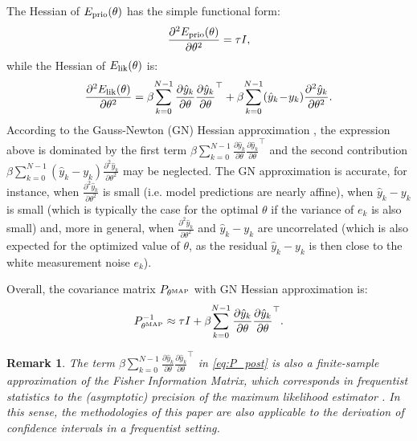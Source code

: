 \documentclass{article}
\newcommand{\nsamp}{N}
\newcommand{\MAP}{{\rm MAP}}
\newcommand{\mean}[1]{\hat{#1}}
\newtheorem{remark}{Remark}%
\begin{document}
The Hessian of $E_{\rm prio}(\theta)$ has the simple functional form:
\begin{equation}
 \frac{\partial^2 E_{\rm prio}(\theta)}{\partial \theta^2} 
 = \tau I,
\end{equation}
while the Hessian of $E_{\rm lik}(\theta)$ is:
\begin{equation}
\label{eq:full_hessian}
\frac{\partial^2 E_{\rm lik}(\theta)}{\partial \theta^2}
=  \beta \!\sum_{k=0}^{\nsamp-1} \frac{\partial \mean{y}_k}{\partial \theta} {\frac{\partial \mean{y}_k}{\partial \theta}}^{\top} +%
\beta \!\sum_{k=0}^{\nsamp-1} (\mean{y}_k\! -\! y_k) \frac{\partial^2 \mean{y}_k}{\partial \theta^2}.
\end{equation}
According to the  Gauss-Newton (GN) Hessian approximation \citep{wright1999numerical}, the expression above  is dominated by the first term $\beta \!\sum_{k=0}^{\nsamp-1} \frac{\partial \mean{y}_k}{\partial \theta} {\frac{\partial \mean{y}_k}{\partial \theta}}^{\top}$ and the second contribution $\beta \sum_{k=0}^{\nsamp-1} (\mean{y}_k - y_k) \frac{\partial^2 \mean{y}_k}{\partial \theta^2}$ may be neglected.  The GN approximation is accurate, for instance, when $\frac{\partial^2 \mean{y}_k}{\partial \theta^2}$ is small (i.e. model predictions are nearly affine), when $\mean{y}_k - y_k$ is small (which is typically the case for the optimal $\theta$ if the variance of $e_k$ 
is also small) and, more in general, when $\frac{\partial^2 \mean{y}_k}{\partial \theta^2}$ and $\mean{y}_k - y_k$ are uncorrelated (which is also expected
for the optimized value of $\theta$, as the residual $\mean{y}_k - y_k$ is then close to the white measurement noise $e_k$).


Overall, the covariance matrix $P_{\theta^{\MAP}}$ with GN Hessian approximation is:
\begin{equation}
\label{eq:P_post}
P_{\theta^{\rm MAP}}^{-1} \approx \tau I + \beta \!\sum_{k=0}^{\nsamp-1} \frac{\partial \mean{y}_k}{\partial \theta} {\frac{\partial \mean{y}_k}{\partial \theta}}^\top.
\end{equation}


\begin{remark}
The term $\beta \!\sum_{k=0}^{\nsamp-1} \frac{\partial \mean{y}_k}{\partial \theta} {\frac{\partial \mean{y}_k}{\partial \theta}}^\top$ in \eqref{eq:P_post} is also a finite-sample approximation of the \emph{Fisher Information Matrix}, which corresponds in frequentist statistics to the (asymptotic) precision of the maximum likelihood estimator \citep{van2007parameter}. In this sense, the methodologies of this paper are also applicable to the derivation of confidence intervals in a frequentist setting.
\end{remark}
\end{document}

